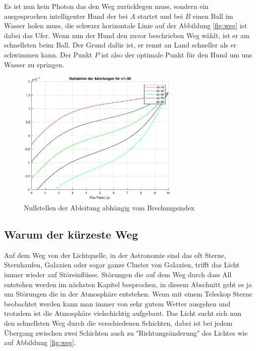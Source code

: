 \begin{refsection}
Es ist nun kein Photon das den Weg zurücklegen muss, sondern ein ausgesprochen intelligenter Hund der bei $A$ startet und bei $B$ einen Ball im Wasser holen muss, die schwarz horizontale Linie auf der Abbildung \ref{fig:weg} ist dabei das Ufer. Wenn nun der Hund den zuvor beschrieben Weg wählt, ist er am schnellsten beim Ball. Der Grund dafür ist, er rennt an Land schneller als er schwimmen kann. Der Punkt $P$ ist also der optimale Punkt für den Hund um uns Wasser zu springen.
\begin{figure}
  \centering
  \includegraphics[width=0.7\textwidth]{adaptiv/images/Nullstellen}
  \caption{Nullstellen der Ableitung abhängig vom Brechungsindex}
  \label{fig:nullstelle}
\end{figure}

\subsection{Warum der kürzeste Weg}
Auf dem Weg von der Lichtquelle, in der Astronomie sind das oft Sterne, Sternhaufen, Galaxien oder sogar ganze Cluster von Galaxien, trifft das Licht immer wieder auf Störeinflüsse. Störungen die auf dem Weg durch dass All entstehen werden im nächsten Kapitel besprochen, in diesem Abschnitt geht es ja um Störungen die in der Atmosphäre entstehen. Wenn mit einem Teleskop Sterne beobachtet werden kann man immer von sehr gutem Wetter ausgehen und trotzdem ist die Atmosphäre vielschichtig aufgebaut. Das Licht sucht sich nun den schnellsten Weg durch die verschiedenen Schichten, dabei ist bei jedem Übergang zwischen zwei Schichten auch zu "Richtungsänderung" des Lichtes wie auf Abbildung \ref{fig:weg}.


\end{refsection}
